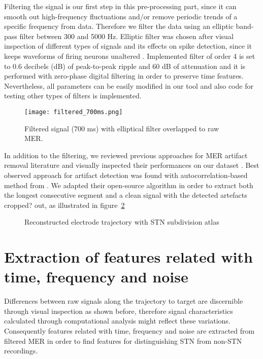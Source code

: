 Filtering the signal is our first step in this pre-processing part, since it can smooth out high-frequency fluctuations and/or remove periodic trends of a specific frequency from data. Therefore we filter the data using an elliptic band-pass filter between 300 and 5000 Hz. Elliptic filter was chosen after visual inspection of different types of signals and its effects on spike detection, since it keeps waveforms of firing neurons unaltered \cite{QuianQuiroga2009}. Implemented filter of order 4 is set to 0.6 decibels (dB) of peak-to-peak ripple and 60 dB of attenuation and it is performed with zero-phase digital filtering in order to preserve time features. Nevertheless, all parameters can be easily modified in our tool and also code for testing other types of filters is implemented.

\begin{figure}[!htb]
     \centering    
              \texttt{[image: filtered\_700ms.png]} 
       \caption{Filtered signal (700 ms) with elliptical filter overlapped to raw MER.}
     \label{fig:artifacts}
\end{figure}

In addition to the filtering, we reviewed previous approaches for MER artifact removal literature and visually inspected their performances on our dataset \cite{OShea2017, Bakstein2017, Grubhoffer2016}. Best observed approach for artifact detection was found with autocorrelation-based method from . We  adapted their open-source algorithm in order to extract both the longest consecutive segment and a clean signal with the detected artefacts cropped? out, as illustrated in figure~\ref{fig:artifacts}

\begin{figure}[!htb]
     \centering    
       \caption{Reconstructed electrode trajectory with STN subdivision atlas}
     \label{fig:artifacts}
\end{figure}



\section{Extraction of features related with time, frequency and noise}
\label{sec:tfnFeat}

Differences between raw signals along the trajectory to target are discernible through visual inspection as shown before, therefore signal characteristics calculated through computational analysis might reflect these variations. Consequently features related with time, frequency and noise are extracted from filtered MER in order to find features for distinguishing STN from non-STN recordings.

